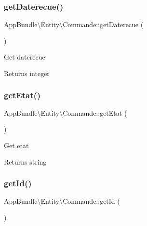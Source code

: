 \subsubsection{\texorpdfstring{get\+Daterecue()}{getDaterecue()}}
{\footnotesize\ttfamily App\+Bundle\textbackslash{}\+Entity\textbackslash{}\+Commande\+::get\+Daterecue (\begin{DoxyParamCaption}{ }\end{DoxyParamCaption})}

Get daterecue

\begin{DoxyReturn}{Returns}
integer 
\end{DoxyReturn}
\mbox{\label{class_app_bundle_1_1_entity_1_1_commande_acfb1b96cefd5d88deb402c28ea1ae7bd}} 
\subsubsection{\texorpdfstring{get\+Etat()}{getEtat()}}
{\footnotesize\ttfamily App\+Bundle\textbackslash{}\+Entity\textbackslash{}\+Commande\+::get\+Etat (\begin{DoxyParamCaption}{ }\end{DoxyParamCaption})}

Get etat

\begin{DoxyReturn}{Returns}
string 
\end{DoxyReturn}
\mbox{\label{class_app_bundle_1_1_entity_1_1_commande_a38c9a006beda317fc911059f42150b55}} 
\subsubsection{\texorpdfstring{get\+Id()}{getId()}}
{\footnotesize\ttfamily App\+Bundle\textbackslash{}\+Entity\textbackslash{}\+Commande\+::get\+Id (\begin{DoxyParamCaption}{ }\end{DoxyParamCaption})}

